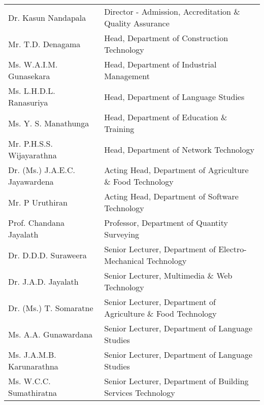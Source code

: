 \begin{longtable}{ L{4.8cm}  L{6.5cm} } 

     Dr. Kasun Nandapala & Director - Admission, Accreditation \& Quality Assurance \\

      Mr. T.D. Denagama & Head, Department of Construction Technology \\

        Ms. W.A.I.M. Gunasekara & Head, Department of Industrial Management \\

       Ms. L.H.D.L. Ranasuriya & Head, Department of Language Studies \\

    Ms. Y. S. Manathunga & Head, Department of Education \& Training \\

     Mr. P.H.S.S. Wijayarathna & Head, Department of Network Technology \\
      
     Dr. (Ms.) J.A.E.C. Jayawardena & Acting Head, Department of Agriculture \& Food Technology \\


   

   

     
    Mr. P Uruthiran & Acting Head, Department of Software Technology \\

   


     Prof. Chandana Jayalath & Professor, Department of  Quantity Surveying \\

     Dr. D.D.D. Suraweera  & Senior Lecturer, Department of Electro-Mechanical Technology\\

     Dr. J.A.D. Jayalath & Senior Lecturer, Multimedia \& Web Technology \\

     Dr. (Ms.) T. Somaratne & Senior Lecturer, Department of Agriculture \& Food Technology \\

       Ms. A.A. Gunawardana & Senior Lecturer, Department of Language Studies \\

         Ms. J.A.M.B. Karunarathna & Senior Lecturer, Department of Language Studies \\

          Ms. W.C.C. Sumathiratna & Senior Lecturer, Department of Building Services Technology \\



\end{longtable}
